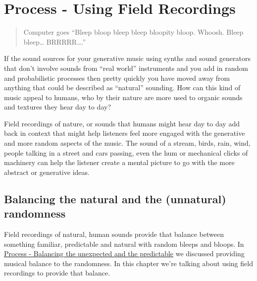 \documentclass[
  12pt,
  letterpaper,
  oneside,
  open=any]{scrbook}
\begin{document}

\chapter{Process - Using Field
Recordings}\label{019-Process-Using_Field_Recordings}

\begin{quote}
Computer goes ``Bleep bloop bleep bleep bloopity bloop. Whoosh. Bleep
bleep\ldots{} BRRRRR\ldots.''
\end{quote}

If the sound sources for your generative music using synths and sound
generators that don't involve sounds from ``real world'' instruments and
you add in random and probabilistic processes then pretty quickly you
have moved away from anything that could be described as ``natural''
sounding. How can this kind of music appeal to humans, who by their
nature are more used to organic sounds and textures they hear day to
day?

\begin{tcolorbox}[enhanced jigsaw, toprule=.15mm, leftrule=.75mm, coltitle=black, bottomtitle=1mm, colbacktitle=quarto-callout-tip-color!10!white, bottomrule=.15mm, opacityback=0, colback=white, arc=.35mm, colframe=quarto-callout-tip-color-frame, opacitybacktitle=0.6, toptitle=1mm, titlerule=0mm, rightrule=.15mm, title=\textcolor{quarto-callout-tip-color}{\faLightbulb}\hspace{0.5em}{Key idea}, left=2mm, breakable]

Field recordings of nature, or sounds that humans might hear day to day
add back in context that might help listeners feel more engaged with the
generative and more random aspects of the music. The sound of a stream,
birds, rain, wind, people talking in a street and cars passing, even the
hum or mechanical clicks of machinery can help the listener create a
mental picture to go with the more abstract or generative ideas.

\end{tcolorbox}

\section{Balancing the natural and the (unnatural)
randomness}\label{balancing-the-natural-and-the-unnatural-randomness}

Field recordings of natural, human sounds provide that balance between
something familiar, predictable and natural with random bleeps and
bloops. In
\hyperref[009-Process-Balance_unexpected_and_predictable]{Process -
Balancing the unexpected and the predictable} we discussed providing
musical balance to the randomness. In this chapter we're talking about
using field recordings to provide that balance.
\end{document}
